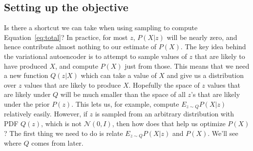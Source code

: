 \documentclass[a4paper, 11pt]{article} %
\begin{document}
\subsection{Setting up the objective}

Is there a shortcut we can take when using sampling to compute Equation~\ref{eq:total}? 
In practice, for most $z$, $P(X|z)$ will be nearly zero, and hence contribute almost nothing to our estimate of $P(X)$.
The key idea behind the variational autoencoder is to attempt to sample values of $z$ that are likely to have produced $X$, and compute $P(X)$ just from those.
This means that we need a new function $Q(z|X)$ which can take a value of $X$ and give us a distribution over $z$ values that are likely to produce $X$.  
Hopefully the space of $z$ values that are likely under $Q$ will be much smaller than the space of all $z$'s that are likely under the prior $P(z)$.
This lets us, for example, compute $E_{z\sim Q}P(X|z)$ relatively easily.
However, if $z$ is sampled from an arbitrary distribution with PDF $Q(z)$, which is not $\mathcal{N}(0,I)$, then how does that help us optimize $P(X)$?
The first thing we need to do is relate $E_{z\sim Q}P(X|z)$ and $P(X)$.
We'll see where $Q$ comes from later.
\end{document}
